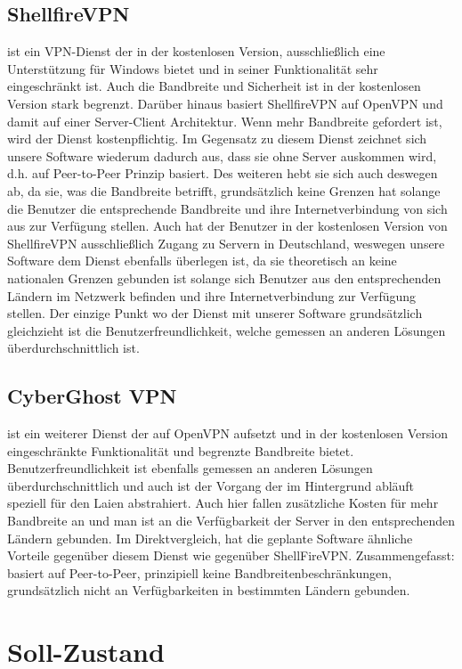 \documentclass[a4paper,12pt]{scrreprt}
\begin{document}
	\subsection{ShellfireVPN} ist ein VPN-Dienst der in der kostenlosen Version, ausschließlich eine Unterstützung für Windows bietet und in seiner Funktionalität sehr eingeschränkt ist. Auch die Bandbreite und Sicherheit ist in der kostenlosen Version stark begrenzt. Darüber hinaus basiert ShellfireVPN auf OpenVPN und damit auf einer Server-Client Architektur. Wenn mehr Bandbreite gefordert ist, wird der Dienst kostenpflichtig. Im Gegensatz zu diesem Dienst zeichnet sich unsere Software wiederum dadurch aus, dass sie ohne Server auskommen wird, d.h. auf Peer-to-Peer Prinzip basiert. Des weiteren hebt sie sich auch deswegen ab, da sie, was die Bandbreite betrifft, grundsätzlich keine Grenzen hat solange die Benutzer die entsprechende Bandbreite und ihre Internetverbindung von sich aus zur Verfügung stellen. Auch hat der Benutzer in der kostenlosen Version von ShellfireVPN ausschließlich Zugang zu Servern in Deutschland, weswegen unsere Software dem Dienst ebenfalls überlegen ist, da sie theoretisch an keine nationalen Grenzen gebunden ist solange sich Benutzer aus den entsprechenden Ländern im Netzwerk befinden und ihre Internetverbindung zur Verfügung stellen. Der einzige Punkt wo der Dienst mit unserer Software grundsätzlich gleichzieht ist die Benutzerfreundlichkeit, welche gemessen an anderen Lösungen überdurchschnittlich ist.
	
	\subsection{CyberGhost VPN} ist ein weiterer Dienst der auf OpenVPN aufsetzt und in der kostenlosen Version eingeschränkte Funktionalität und begrenzte Bandbreite bietet. Benutzerfreundlichkeit ist ebenfalls gemessen an anderen Lösungen überdurchschnittlich und auch ist der Vorgang der im Hintergrund abläuft speziell für den Laien abstrahiert. Auch hier fallen zusätzliche Kosten für mehr Bandbreite an und man ist an die Verfügbarkeit der Server in den entsprechenden Ländern gebunden. Im Direktvergleich, hat die geplante Software ähnliche Vorteile gegenüber diesem Dienst wie gegenüber ShellFireVPN. Zusammengefasst: basiert auf Peer-to-Peer, prinzipiell keine Bandbreitenbeschränkungen, grundsätzlich nicht an Verfügbarkeiten in bestimmten Ländern gebunden.
	
		
	\section{Soll-Zustand}
		
\end{document}
